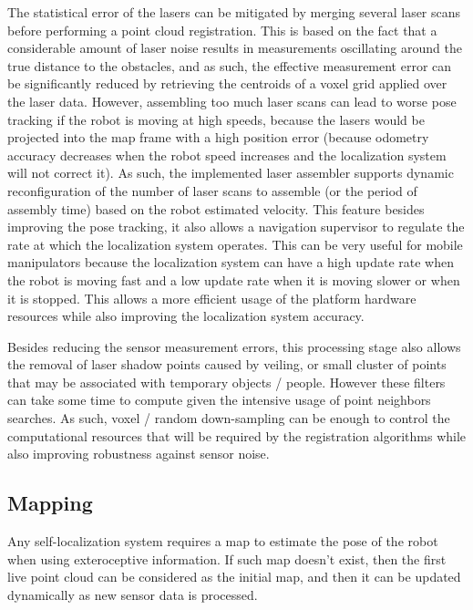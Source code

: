 The statistical error of the lasers can be mitigated by merging several laser scans before performing a point cloud registration. This is based on the fact that a considerable amount of laser noise results in measurements oscillating around the true distance to the obstacles, and as such, the effective measurement error can be significantly reduced by retrieving the centroids of a voxel grid applied over the laser data. However, assembling too much laser scans can lead to worse pose tracking if the robot is moving at high speeds, because the lasers would be projected into the map frame with a high position error (because odometry accuracy decreases when the robot speed increases and the localization system will not correct it). As such, the implemented laser assembler supports dynamic reconfiguration of the number of laser scans to assemble (or the period of assembly time) based on the robot estimated velocity. This feature besides improving the pose tracking, it also allows a navigation supervisor to regulate the rate at which the localization system operates. This can be very useful for mobile manipulators because the localization system can have a high update rate when the robot is moving fast and a low update rate when it is moving slower or when it is stopped. This allows a more efficient usage of the platform hardware resources while also improving the localization system accuracy.

Besides reducing the sensor measurement errors, this processing stage also allows the removal of laser shadow points caused by veiling, or small cluster of points that may be associated with temporary objects / people. However these filters can take some time to compute given the intensive usage of point neighbors searches. As such, voxel / random down-sampling can be enough to control the computational resources that will be required by the registration algorithms while also improving robustness against sensor noise.


\subsection{Mapping}

Any self-localization system requires a map to estimate the pose of the robot when using exteroceptive information. If such map doesn't exist, then the first live point cloud can be considered as the initial map, and then it can be updated dynamically as new sensor data is processed.

